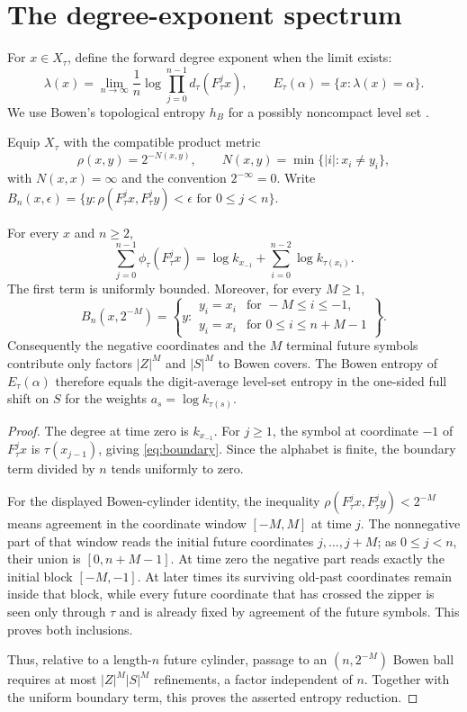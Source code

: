 \section{The degree-exponent spectrum}\label{sec:multi}

For $x\in X_\tau$, define the forward degree exponent when the limit exists:
\[
 \lambda(x)=\lim_{n\to\infty}\frac1n
 \log\prod_{j=0}^{n-1}d_\tau(F_\tau^j x),
 \qquad
 E_\tau(\alpha)=\{x:\lambda(x)=\alpha\}.
 \tag{5.1}\label{eq:level}
\]
We use Bowen's topological entropy $h_B$ for a possibly noncompact level set
\citep{Bowen1973}.

Equip $X_\tau$ with the compatible product metric
\[
 \rho(x,y)=2^{-N(x,y)},\qquad
 N(x,y)=\min\{|i|:x_i\ne y_i\},
\]
with $N(x,x)=\infty$ and the convention $2^{-\infty}=0$.  Write
$B_n(x,\epsilon)=\{y:\rho(F_\tau^j x,F_\tau^j y)<\epsilon
\text{ for }0\leq j<n\}$.

\begin{lemma}\label{lem:boundary}
For every $x$ and $n\geq2$,
\[
 \sum_{j=0}^{n-1}\phi_\tau(F_\tau^j x)
 =\log k_{x_{-1}}+
 \sum_{i=0}^{n-2}\log k_{\tau(x_i)}.
 \tag{5.2}\label{eq:boundary}
\]
The first term is uniformly bounded.  Moreover, for every $M\geq1$,
\[
 B_n(x,2^{-M})=
 \left\{y:\begin{array}{ll}
 y_i=x_i&\text{for }-M\leq i\leq-1,\\
 y_i=x_i&\text{for }0\leq i\leq n+M-1
 \end{array}\right\}.
\]
Consequently the negative coordinates and the $M$ terminal future symbols
contribute only factors $|Z|^M$ and $|S|^M$ to Bowen covers.  The Bowen
entropy of $E_\tau(\alpha)$ therefore equals the digit-average level-set
entropy in the one-sided full shift on $S$ for the weights
$a_s=\log k_{\tau(s)}$.
\end{lemma}

\begin{proof}
The degree at time zero is $k_{x_{-1}}$.  For $j\geq1$, the symbol at
coordinate $-1$ of $F_\tau^j x$ is $\tau(x_{j-1})$, giving
\eqref{eq:boundary}.  Since the alphabet is finite, the boundary term divided
by $n$ tends uniformly to zero.

For the displayed Bowen-cylinder identity, the inequality
$\rho(F_\tau^j x,F_\tau^j y)<2^{-M}$ means agreement in the coordinate
window $[-M,M]$ at time $j$.  The nonnegative part of that window reads the
initial future coordinates $j,\ldots,j+M$; as $0\leq j<n$, their union is
$[0,n+M-1]$.  At time zero the negative part reads exactly the initial block
$[-M,-1]$.  At later times its surviving old-past coordinates remain inside
that block, while every future coordinate that has crossed the zipper is
seen only through $\tau$ and is already fixed by agreement of the future
symbols.  This proves both inclusions.

Thus, relative to a length-$n$ future cylinder, passage to an
$(n,2^{-M})$ Bowen ball requires at most $|Z|^M|S|^M$ refinements, a factor
independent of $n$.  Together with the uniform boundary term, this proves
the asserted entropy reduction.
\end{proof}

